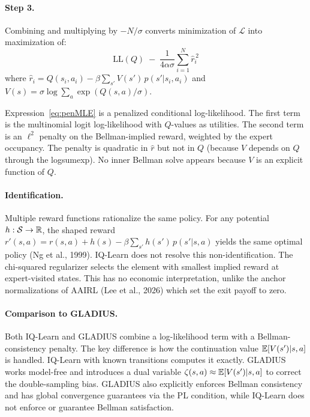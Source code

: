 \documentclass[11pt]{article}
\begin{document}
\paragraph{Step 3.} Combining and multiplying by $-N/\sigma$ converts minimization of $\mathcal{L}$ into maximization of:
\begin{equation}
\boxed{\;\mathrm{LL}(Q) \;-\; \frac{1}{4\alpha\sigma}\sum_{i=1}^{N} \hat{r}_i^{\,2}\;}
\label{eq:penMLE}
\end{equation}
where $\hat{r}_i = Q(s_i,a_i) - \beta\sum_{s'} V(s')\,p(s'|s_i,a_i)$ and $V(s) = \sigma\log\sum_a\exp(Q(s,a)/\sigma)$.

Expression~\eqref{eq:penMLE} is a penalized conditional log-likelihood. The first term is the multinomial logit log-likelihood with $Q$-values as utilities. The second term is an $\ell^2$ penalty on the Bellman-implied reward, weighted by the expert occupancy. The penalty is quadratic in $\hat{r}$ but not in $Q$ (because $V$ depends on $Q$ through the logsumexp). No inner Bellman solve appears because $V$ is an explicit function of $Q$.

\paragraph{Identification.} Multiple reward functions rationalize the same policy. For any potential $h: \mathcal{S} \to \mathbb{R}$, the shaped reward $r'(s,a) = r(s,a) + h(s) - \beta\sum_{s'} h(s')\,p(s'|s,a)$ yields the same optimal policy (Ng et al., 1999). IQ-Learn does not resolve this non-identification. The chi-squared regularizer selects the element with smallest implied reward at expert-visited states. This has no economic interpretation, unlike the anchor normalizations of AAIRL (Lee et al., 2026) which set the exit payoff to zero.

\paragraph{Comparison to GLADIUS.} Both IQ-Learn and GLADIUS combine a log-likelihood term with a Bellman-consistency penalty. The key difference is how the continuation value $\mathbb{E}[V(s')|s,a]$ is handled. IQ-Learn with known transitions computes it exactly. GLADIUS works model-free and introduces a dual variable $\zeta(s,a) \approx \mathbb{E}[V(s')|s,a]$ to correct the double-sampling bias. GLADIUS also explicitly enforces Bellman consistency and has global convergence guarantees via the PL condition, while IQ-Learn does not enforce or guarantee Bellman satisfaction.
\end{document}

